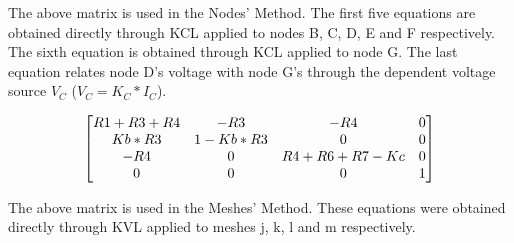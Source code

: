 The above matrix is used in the Nodes' Method. The first five equations are obtained directly through KCL applied to nodes B, C, D, E and F respectively. The sixth equation is obtained through KCL applied to node G. The last equation relates node D's voltage with node G's through the dependent voltage source $V_C$ ($V_C=K_C*I_C$).

\begin{equation}
\begin{bmatrix}
\centering
R1+R3+R4 & -R3 & -R4 & 0\\
Kb*R3 & 1-Kb*R3 & 0 & 0\\
-R4 & 0 & R4+R6+R7-Kc & 0\\
 0 & 0 & 0 & 1
\end{bmatrix}
\end{equation}
\par
\par
The above matrix is used in the Meshes' Method. These equations were obtained directly through KVL applied to meshes j, k, l and m respectively.

\begin{comment}

\begin{table}[h]
  \centering
  \begin{tabular}{|l|r|}
    \hline    
    {\bf Name} & {\bf Value [A or V]} \\ \hline
    
  \end{tabular}
  \caption{Operating point. A variable preceded by @ is of type {\em current}
    and expressed in Ampere; other variables are of type {\it voltage} and expressed in
    Volt.}
  \label{tab:op}
\end{table}

\end{comment}

